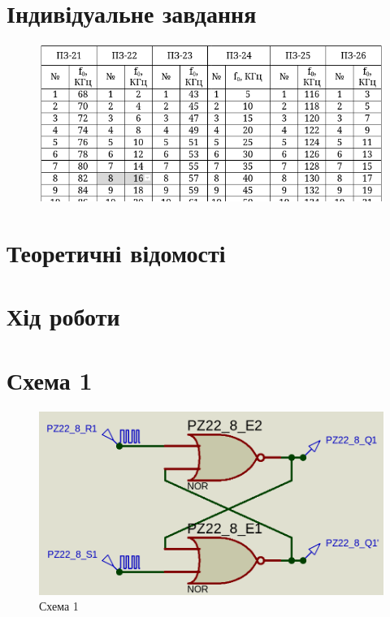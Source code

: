 \documentclass{article}
\begin{document}
\begin{normalsize}
	\section*{Індивідуальне завдання}
\begin{figure}[H]
		\centering
		\includegraphics[scale=0.75]{v}
	\end{figure}	

	\section*{Теоретичні відомості}
	
	
	\section*{Хід роботи}
	

	\section*{Схема 1}	
	\begin{figure}[H]
		\centering
		\includegraphics[scale=0.25]{s1}	
		\caption{Схема 1}
	\end{figure}


\end{normalsize}
\end{document}
